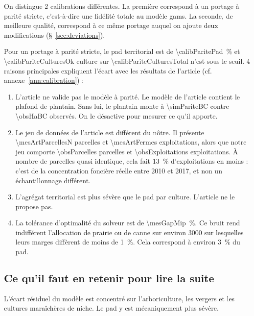 On distingue \num{2} calibrations différentes. La première correspond à un portage à parité
stricte, c'est-à-dire une fidélité totale au modèle \gls{gams}. La seconde, de meilleure qualité,
correspond à ce même portage auquel on ajoute deux modifications (§~\ref{sec:deviations}).

Pour un portage à parité stricte, le \gls{pad} territorial est de
\SI{\calibParitePad}{\percent} et \num{\calibPariteCulturesOk} culture sur
\num{\calibPariteCulturesTotal} n'est sous le seuil. \num{4} raisons principales expliquent l'écart avec les
résultats de l'article (cf. annexe~\ref{ann:calibration}) :

\begin{enumerate}[leftmargin=1.6em,itemsep=6pt]

\item L'article ne valide pas le modèle à parité. Le modèle de l'article contient le plafond de
  plantain. Sans lui, le plantain monte à \SI{\simPariteBC}{\ha} contre \SI{\obsHaBC}{\ha}
  observés. On le désactive pour mesurer ce qu'il apporte.

\item Le jeu de données de l'article est différent du nôtre. Il présente
  \num{\mesArtParcellesN} parcelles et \num{\mesArtFermes} exploitations, alors que notre jeu
  comporte \num{\obsParcelles} parcelles et \num{\obsExploitations} exploitations. À nombre de
  parcelles quasi identique, cela fait \SI{13}{\percent} d'exploitations en moins : c'est de la
  concentration foncière réelle entre 2010 et 2017, et non un échantillonnage différent.

\item L'agrégat territorial est plus sévère que le \gls{pad} par culture. L'article ne le
  propose pas.

\item La tolérance d'optimalité du solveur est de \SI{\mesGapMip}{\percent}. Ce bruit rend
  indifférent l'allocation de prairie ou de canne sur environ \SI{3000}{\ha} sur lesquelles
  leurs marges diffèrent de moins de \SI{1}{\percent}. Cela correspond à environ
  \SI{3}{\percent} du \gls{pad}.

\end{enumerate}

\subsection*{Ce qu'il faut en retenir pour lire la suite}

L'écart résiduel du modèle est concentré sur l'arboriculture, les vergers et les cultures
maraîchères de niche. Le \gls{pad} y est mécaniquement plus sévère.

